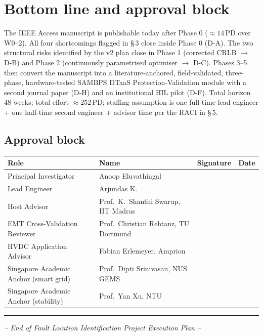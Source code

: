 \documentclass[11pt,a4paper]{article}
\begin{document}
\section{Bottom line and approval block}

\noindent\colorbox{sambplight}{\parbox{\dimexpr\textwidth-2\fboxsep\relax}{%
\vspace{0.1cm}\color{sambpblue}
The IEEE Access manuscript is publishable today after Phase 0 ($\approx 14$\,PD
over W0--2).  All four shortcomings flagged in \S\,3 close inside Phase 0
(D-A).  The two structural risks identified by the v2 plan close in Phase 1
(corrected CRLB $\rightarrow$ D-B) and Phase 2 (continuously parametrised
optimiser $\rightarrow$ D-C).  Phases 3--5 then convert the manuscript into
a literature-anchored, field-validated, three-phase, hardware-tested SAMBPS
DTaaS Protection-Validation module with a second journal paper (D-H) and
an institutional HIL pilot (D-F).  Total horizon 48 weeks; total effort
$\approx 252$\,PD; staffing assumption is one full-time lead engineer + one
half-time second engineer + advisor time per the RACI in \S\,5.
\vspace{0.1cm}
}}

\vspace{0.4cm}

\subsection*{Approval block}

\renewcommand{\arraystretch}{1.6}
\begin{longtable}{L{5.0cm}L{4.6cm}L{3.0cm}L{2.0cm}}
\toprule{}
\textbf{Role} & \textbf{Name} & \textbf{Signature} & \textbf{Date}\\\midrule
Principal Investigator                  & Anoop Eluvathingal                   & & \\
Lead Engineer                           & Arjundas K.                          & & \\
Host Advisor                            & Prof.\ K.\ Shanthi Swarup, IIT Madras & & \\
EMT Cross-Validation Reviewer           & Prof.\ Christian Rehtanz, TU Dortmund & & \\
HVDC Application Advisor                & Fabian Erlemeyer, Amprion            & & \\
Singapore Academic Anchor (smart grid)  & Prof.\ Dipti Srinivasan, NUS GEMS    & & \\
Singapore Academic Anchor (stability)   & Prof.\ Yan Xu, NTU                   & & \\
\bottomrule
\end{longtable}

\vspace{1.0cm}
\hrule
\vspace{0.2cm}
\centerline{\itshape\small -- End of Fault Location Identification Project Execution Plan --}
\end{document}
